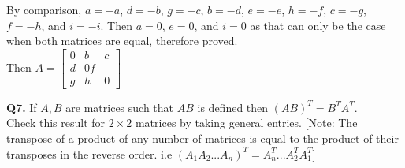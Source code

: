 \documentclass[addpoints]{exam}
\begin{document}
\begin{sloppypar}
\begin{questions}
\begin{solution}
        By comparison, $ a = -a $, $ d = -b $, $ g = -c $, $ b = -d $, $ e = -e $, $ h = -f $, $ c = -g $, $ f = -h $, and $ i = -i $. Then $ a = 0 $, $ e = 0 $, and $ i = 0 $ as that can only be the case when both matrices are equal, therefore proved. \\ 
        Then $ A = \begin{bmatrix}
            0 & b & c \\ d & 0 f \\ g & h & 0
        \end{bmatrix} $
    \end{solution}
    \pagebreak
    \question
    \textbf{Q7. } If $A, B$ are matrices such that $ AB $ is defined then $ (AB)^T = B^TA^T$. \\ 
    Check this result for $ 2 \times 2 $ matrices by taking general entries. [Note: The transpose of a product of any number of matrices is equal to the product of their transposes in the reverse order. i.e $ (A_1A_2...A_n)^T = A^T_n...A^T_2A^T_1 $]
\end{questions}
\end{sloppypar}
\end{document}
